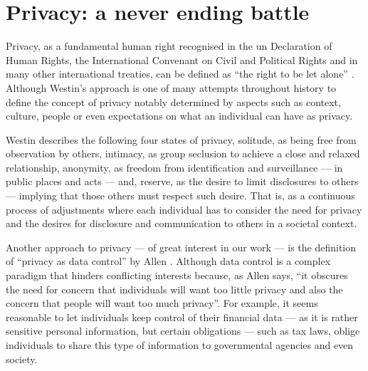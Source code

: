 \documentclass[showtrims, oldfontcommands]{kthesis}
\begin{document}

\section{Privacy: a never ending battle}
    \label{section:privacy-a-never-ending-battle}

Privacy, as a fundamental human right recognised in the \ac{un} Declaration of Human 
Rights, the International Convenant on Civil and Political Rights and in many other 
international treaties, can be defined as ``the right to be let alone'' \cite{Westin70}. 
Although Westin's approach is one of many attempts throughout history to define 
the concept of privacy notably determined by aspects such as context, culture, people 
or even expectations on what an individual can have as privacy.

Westin describes the following four states of privacy, solitude, as being free from 
observation by others, intimacy, as group seclusion to achieve a close and relaxed 
relationship, anonymity, as freedom from identification and surveillance --- in 
public places and acts --- and, reserve, as the desire to limit disclosures to others 
--- implying that those others must respect such desire. That is, as a continuous 
process of adjustments where each individual has to consider the need for privacy 
and the desires for disclosure and communication to others in a societal context.

Another approach to privacy --- of great interest in our work --- is the definition 
of ``privacy as data control'' by Allen \cite{Allen99}. Although data control is 
a complex paradigm that hinders conflicting interests because, as Allen says, ``it 
obscures the need for concern that individuals will want too little privacy and 
also the concern that people will want too much privacy''. For example, it seems 
reasonable to let individuals keep control of their financial data --- as it is 
rather sensitive personal information, but certain obligations --- such as tax laws, 
oblige individuals to share this type of information to governmental agencies and 
even society.
\end{document}
